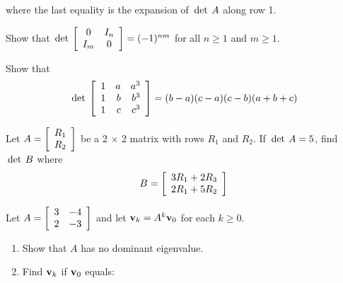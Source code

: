 \begin{multicols}{2}
\begin{supex}
\begin{supsol}
\begin{enumerate}[label={\alph*.}]
where the last equality is the expansion of $\thinspace\operatorname{det \medspace}A$ along row 1.
\end{enumerate}
\end{supsol}
\end{supex}

\begin{supex}
Show that $\thinspace\operatorname{det\medspace} \left[ \begin{array}{cc}
0 & I_n \\
I_m & 0 
\end{array}\right] = (-1)^{nm}$
 for all $n \geq 1$ and $m \geq 1$.

\end{supex}

\begin{supex}
Show that
\begin{equation*}
\thinspace\operatorname{det\medspace} \left[ \begin{array}{rrr}
1 & a & a^3 \\
1 & b & b^3 \\
1 & c & c^3 
\end{array}\right] = (b-a)(c-a)(c-b)(a+b+c)
\end{equation*}
\end{supex}

\columnbreak
\begin{supex}
Let $A = \left[ \begin{array}{c}
R_1 \\
R_2
\end{array}\right]$
 be a 2 $\times$ 2 matrix with rows $R_{1}$ and $R_{2}$. If $\thinspace\operatorname{det \medspace}A = 5$, find $\thinspace\operatorname{det \medspace}B$ where
\begin{equation*}
B = \left[ \begin{array}{c}
3R_1 + 2R_3 \\
2R_1 + 5R_2
\end{array}\right]
\end{equation*}
\end{supex}

\begin{supex}
Let $A = \left[ \begin{array}{rr}
3 & -4 \\
2 & -3 
\end{array}\right]$
 and let $\textbf{v}_{k} = A^{k}\textbf{v}_{0}$ for each $k \geq 0$.


\begin{enumerate}[label={\alph*.}]
\item Show that $A$ has no dominant eigenvalue.

\item Find $\textbf{v}_{k}$ if $\textbf{v}_{0}$ equals:



\end{enumerate}
\end{supex}
\end{multicols}
